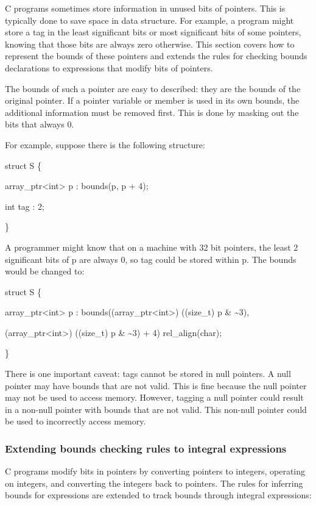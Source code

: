 \documentclass[]{article}
\begin{document}
C programs sometimes store information in unused bits of pointers. This
is typically done to save space in data structure. For example, a
program might store a tag in the least significant bits or most
significant bits of some pointers, knowing that those bits are always
zero otherwise. This section covers how to represent the bounds of these
pointers and extends the rules for checking bounds declarations to
expressions that modify bits of pointers.

The bounds of such a pointer are easy to described: they are the bounds
of the original pointer. If a pointer variable or member is used in its
own bounds, the additional information must be removed first. This is
done by masking out the bits that always 0.

For example, suppose there is the following structure:

struct S \{

array\_ptr\textless{}int\textgreater{} p : bounds(p, p + 4);

int tag : 2;

\}

A programmer might know that on a machine with 32 bit pointers, the
least 2 significant bits of p are always 0, so tag could be stored
within p. The bounds would be changed to:

struct S \{

array\_ptr\textless{}int\textgreater{} p :
bounds((array\_ptr\textless{}int\textgreater{}) ((size\_t) p \&
\textasciitilde{}3),

(array\_ptr\textless{}int\textgreater{}) ((size\_t) p \&
\textasciitilde{}3) + 4) rel\_align(char);

\}

There is one important caveat: tags cannot be stored in null pointers. A
null pointer may have bounds that are not valid. This is fine because
the null pointer may not be used to access memory. However, tagging a
null pointer could result in a non-null pointer with bounds that are not
valid. This non-null pointer could be used to incorrectly access memory.

\subsubsection{Extending bounds checking rules to integral
expressions}\label{extending-bounds-checking-rules-to-integral-expressions}

C programs modify bits in pointers by converting pointers to integers,
operating on integers, and converting the integers back to pointers. The
rules for inferring bounds for expressions are extended to track bounds
through integral expressions:
\end{document}
